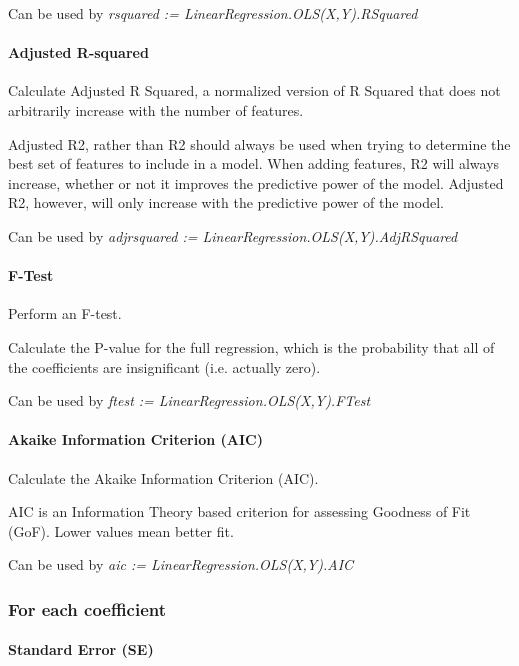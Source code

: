Can be used by \textit{rsquared := LinearRegression.OLS(X,Y).RSquared}

\paragraph{Adjusted R-squared}

Calculate Adjusted R Squared, a normalized version of R Squared that does not arbitrarily increase with the number of features.

Adjusted R2, rather than R2 should always be used when trying to determine the best set of features to include in a model. When adding features, R2 will always increase, whether or not it improves the predictive power of the model. Adjusted R2, however, will only increase with the predictive power of the model.

Can be used by \textit{adjrsquared := LinearRegression.OLS(X,Y).AdjRSquared}

\paragraph{F-Test}

Perform an F-test.

Calculate the P-value for the full regression, which is the probability that all of the coefficients are insignificant (i.e. actually zero).

Can be used by \textit{ftest := LinearRegression.OLS(X,Y).FTest}

\paragraph{Akaike Information Criterion (AIC)}

Calculate the Akaike Information Criterion (AIC).

AIC is an Information Theory based criterion for assessing Goodness of Fit (GoF). Lower values mean better fit.

Can be used by \textit{aic := LinearRegression.OLS(X,Y).AIC}

\subsubsection{For each coefficient}

\paragraph{Standard Error (SE)}

